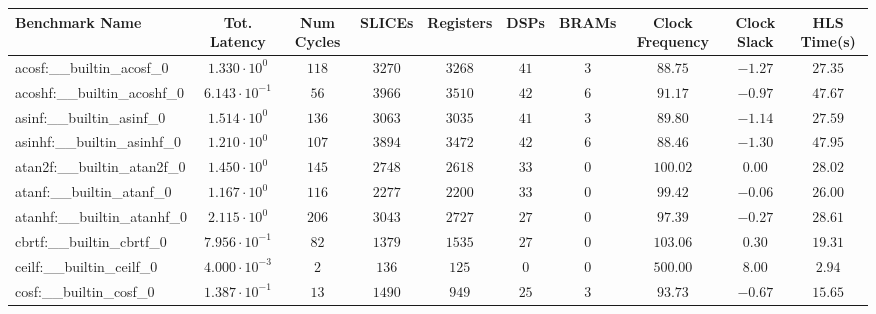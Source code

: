 \begin{tabular}{|l|c|c|c|c|c|c|c|c|c|}
\hline
Benchmark Name                            & Tot. Latency            & Num Cycles & SLICEs    & Registers & DSPs    & BRAMs  & Clock Frequency & Clock Slack & HLS Time(s) \\
\hline
acosf:\_\_builtin\_acosf\_0               & $ 1.330 \cdot 10^{0}  $ & $ 118    $ & $ 3270  $ & $ 3268  $ & $ 41  $ & $ 3  $ & $ 88.75       $ & $ -1.27   $ & $ 27.35   $ \\
acoshf:\_\_builtin\_acoshf\_0             & $ 6.143 \cdot 10^{-1} $ & $ 56     $ & $ 3966  $ & $ 3510  $ & $ 42  $ & $ 6  $ & $ 91.17       $ & $ -0.97   $ & $ 47.67   $ \\
asinf:\_\_builtin\_asinf\_0               & $ 1.514 \cdot 10^{0}  $ & $ 136    $ & $ 3063  $ & $ 3035  $ & $ 41  $ & $ 3  $ & $ 89.80       $ & $ -1.14   $ & $ 27.59   $ \\
asinhf:\_\_builtin\_asinhf\_0             & $ 1.210 \cdot 10^{0}  $ & $ 107    $ & $ 3894  $ & $ 3472  $ & $ 42  $ & $ 6  $ & $ 88.46       $ & $ -1.30   $ & $ 47.95   $ \\
atan2f:\_\_builtin\_atan2f\_0             & $ 1.450 \cdot 10^{0}  $ & $ 145    $ & $ 2748  $ & $ 2618  $ & $ 33  $ & $ 0  $ & $ 100.02      $ & $ 0.00    $ & $ 28.02   $ \\
atanf:\_\_builtin\_atanf\_0               & $ 1.167 \cdot 10^{0}  $ & $ 116    $ & $ 2277  $ & $ 2200  $ & $ 33  $ & $ 0  $ & $ 99.42       $ & $ -0.06   $ & $ 26.00   $ \\
atanhf:\_\_builtin\_atanhf\_0             & $ 2.115 \cdot 10^{0}  $ & $ 206    $ & $ 3043  $ & $ 2727  $ & $ 27  $ & $ 0  $ & $ 97.39       $ & $ -0.27   $ & $ 28.61   $ \\
cbrtf:\_\_builtin\_cbrtf\_0               & $ 7.956 \cdot 10^{-1} $ & $ 82     $ & $ 1379  $ & $ 1535  $ & $ 27  $ & $ 0  $ & $ 103.06      $ & $ 0.30    $ & $ 19.31   $ \\
ceilf:\_\_builtin\_ceilf\_0               & $ 4.000 \cdot 10^{-3} $ & $ 2      $ & $ 136   $ & $ 125   $ & $ 0   $ & $ 0  $ & $ 500.00      $ & $ 8.00    $ & $ 2.94    $ \\
cosf:\_\_builtin\_cosf\_0                 & $ 1.387 \cdot 10^{-1} $ & $ 13     $ & $ 1490  $ & $ 949   $ & $ 25  $ & $ 3  $ & $ 93.73       $ & $ -0.67   $ & $ 15.65   $ \\

\end{tabular}
